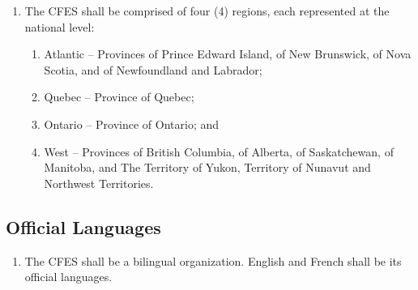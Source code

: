 \begin{enumerate}
 \item The CFES shall be comprised of four (4) regions, each represented at the national level:
  \begin{enumerate}
   \item Atlantic – Provinces of Prince Edward Island, of New Brunswick, of Nova Scotia, and of Newfoundland and Labrador;
   \item Quebec – Province of Quebec;
   \item Ontario – Province of Ontario; and
   \item West – Provinces of British Columbia, of Alberta, of Saskatchewan, of Manitoba, and The Territory of Yukon, Territory of Nunavut and Northwest Territories.
  \end{enumerate}
\end{enumerate}

\subsection{Official Languages}
\label{dispositions-official-languages}

\begin{enumerate}
 \item The CFES shall be a bilingual organization. English and French shall be its official languages.
\end{enumerate}
